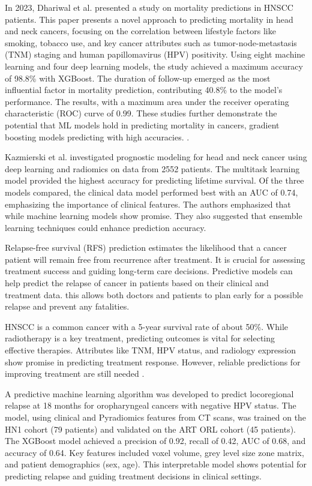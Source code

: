 \documentclass[conference]{IEEEtran}
\begin{document}
In 2023, Dhariwal et al. presented a study on mortality predictions in HNSCC patients. This paper presents a novel approach to predicting mortality in head and neck cancers, focusing on the correlation between lifestyle factors like smoking, tobacco use, and key cancer attributes such as tumor-node-metastasis (TNM) staging and human papillomavirus (HPV) positivity. Using eight machine learning and four deep learning models, the study achieved a maximum accuracy of 98.8\% with XGBoost. The duration of follow-up emerged as the most influential factor in mortality prediction, contributing 40.8\% to the model's performance. The results, with a maximum area under the receiver operating characteristic (ROC) curve of 0.99. These studies further demonstrate the potential that ML models hold in predicting mortality in cancers, gradient boosting models predicting with high accuracies. \cite{b6, b7}. 

Kazmierski et al. \cite{b8} investigated prognostic modeling for head and neck cancer using deep learning and radiomics on data from 2552 patients. The multitask learning model provided the highest accuracy for predicting lifetime survival. Of the three models compared, the clinical data model performed best with an AUC of 0.74, emphasizing the importance of clinical features. The authors emphasized that while machine learning models show promise. They also suggested that ensemble learning techniques could enhance prediction accuracy.

Relapse-free survival (RFS) prediction estimates the likelihood that a cancer patient will remain free from recurrence after treatment. It is crucial for assessing treatment success and guiding long-term care decisions. Predictive models can help predict the relapse of cancer in patients based on their clinical and treatment data. this allows both doctors and patients to plan early for a possible relapse and prevent any fatalities.

HNSCC is a common cancer with a 5-year survival rate of about 50\%. While radiotherapy is a key treatment, predicting outcomes is vital for selecting effective therapies. Attributes like TNM, HPV status, and radiology expression show promise in predicting treatment response. However, reliable predictions for improving treatment are still needed \cite{b9}.

A predictive machine learning algorithm was developed to predict locoregional relapse at 18 months for oropharyngeal cancers with negative HPV status. The model, using clinical and Pyradiomics features from CT scans, was trained on the HN1 cohort (79 patients) and validated on the ART ORL cohort (45 patients). The XGBoost model achieved a precision of 0.92, recall of 0.42, AUC of 0.68, and accuracy of 0.64. Key features included voxel volume, grey level size zone matrix, and patient demographics (sex, age). This interpretable model shows potential for predicting relapse and guiding treatment decisions in clinical settings.
\end{document}

